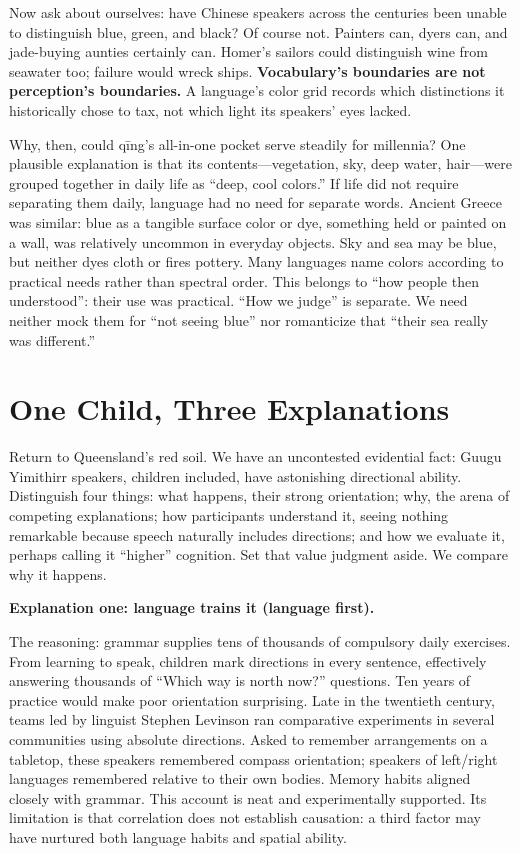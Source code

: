 Now ask about ourselves: have Chinese speakers across the centuries been unable to distinguish blue, green, and black? Of course not. Painters can, dyers can, and jade-buying aunties certainly can. Homer's sailors could distinguish wine from seawater too; failure would wreck ships. \textbf{Vocabulary's boundaries are not perception's boundaries.} A language's color grid records which distinctions it historically chose to tax, not which light its speakers' eyes lacked.

Why, then, could qīng's all-in-one pocket serve steadily for millennia? One plausible explanation is that its contents---vegetation, sky, deep water, hair---were grouped together in daily life as ``deep, cool colors.'' If life did not require separating them daily, language had no need for separate words. Ancient Greece was similar: blue as a tangible surface color or dye, something held or painted on a wall, was relatively uncommon in everyday objects. Sky and sea may be blue, but neither dyes cloth or fires pottery. Many languages name colors according to practical needs rather than spectral order. This belongs to ``how people then understood'': their use was practical. ``How we judge'' is separate. We need neither mock them for ``not seeing blue'' nor romanticize that ``their sea really was different.''

\section{One Child, Three Explanations}
Return to Queensland's red soil. We have an uncontested evidential fact: Guugu Yimithirr speakers, children included, have astonishing directional ability. Distinguish four things: what happens, their strong orientation; why, the arena of competing explanations; how participants understand it, seeing nothing remarkable because speech naturally includes directions; and how we evaluate it, perhaps calling it ``higher'' cognition. Set that value judgment aside. We compare why it happens.

\textbf{Explanation one: language trains it (language first).}

The reasoning: grammar supplies tens of thousands of compulsory daily exercises. From learning to speak, children mark directions in every sentence, effectively answering thousands of ``Which way is north now?'' questions. Ten years of practice would make poor orientation surprising. Late in the twentieth century, teams led by linguist Stephen Levinson ran comparative experiments in several communities using absolute directions. Asked to remember arrangements on a tabletop, these speakers remembered compass orientation; speakers of left/right languages remembered relative to their own bodies. Memory habits aligned closely with grammar. This account is neat and experimentally supported. Its limitation is that correlation does not establish causation: a third factor may have nurtured both language habits and spatial ability.

